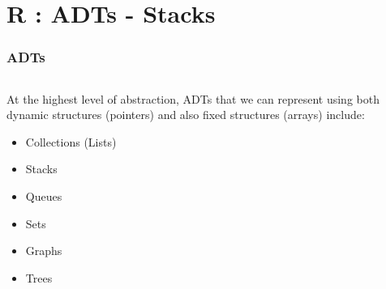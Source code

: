 \section{R : ADTs - Stacks}
\label{chap:adts_stacks}


\begin{frame}[fragile]
\frametitle{ADTs}
\begin{columns}[T]

\begin{column}{0.45\textwidth}
At the highest level of abstraction, ADTs that we can represent
using both dynamic structures (pointers) and also fixed structures (arrays) include:
\begin{itemize}[<+->]
\item Collections (Lists)
\item Stacks
\item Queues
\item Sets
\item Graphs
\item Trees
\end{itemize}
\end{column}


\end{columns}
\end{frame}
